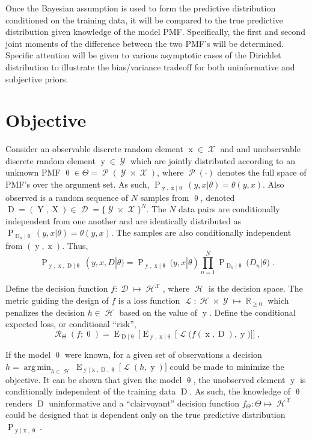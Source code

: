 \documentclass[conference]{IEEEtran}
\DeclareMathOperator*{\argmin}{arg\,min}
\DeclareMathOperator{\xrm}{\mathrm{x}}
\DeclareMathOperator{\Xrm}{\mathrm{X}}
\DeclareMathOperator{\yrm}{\mathrm{y}}
\DeclareMathOperator{\Yrm}{\mathrm{Y}}
\DeclareMathOperator{\Drm}{\mathrm{D}}
\DeclareMathOperator{\Prm}{\mathrm{P}}
\DeclareMathOperator{\Erm}{\mathrm{E}}
\DeclareMathOperator{\Xcal}{\mathcal{X}}
\DeclareMathOperator{\Ycal}{\mathcal{Y}}
\DeclareMathOperator{\Dcal}{\mathcal{D}}
\DeclareMathOperator{\Hcal}{\mathcal{H}}
\DeclareMathOperator{\Rcal}{\mathcal{R}}
\DeclareMathOperator{\Pcal}{\mathcal{P}}
\DeclareMathOperator{\Lcal}{\mathcal{L}}
\DeclareMathOperator{\Rbb}{\mathbb{R}}
\begin{document}
Once the Bayesian assumption is used to form the predictive distribution conditioned on the training data, it will be compared to the true predictive distribution given knowledge of the model PMF. Specifically, the first and second joint moments of the difference between the two PMF's will be determined. Specific attention will be given to various asymptotic cases of the Dirichlet distribution to illustrate the bias/variance tradeoff for both uninformative and subjective priors.







\section{Objective}

Consider an observable discrete random element $\xrm \in \Xcal$ and and unobservable discrete random element $\yrm \in \Ycal$ which are jointly distributed according to an unknown PMF $\uptheta \in \Theta = \Pcal(\Ycal \times \Xcal)$, where $\Pcal(\cdot)$ denotes the full space of PMF's over the argument set. As such, $\Prm_{\yrm,\xrm | \uptheta}(y,x | \theta) = \theta(y,x)$. Also observed is a random sequence of $N$ samples from $\uptheta$, denoted $\Drm = ( \Yrm,\Xrm ) \in \Dcal = \{\Ycal \times \Xcal\}^N$. The $N$ data pairs are conditionally independent from one another and are identically distributed as $\Prm_{\Drm_n | \uptheta}(y,x | \theta) = \theta(y,x)$. The samples are also conditionally independent from $(\yrm,\xrm)$. Thus,
\begin{equation}
\Prm_{\yrm,\xrm,\Drm | \uptheta}(y,x,D | \theta) = \Prm_{\yrm,\xrm | \uptheta}(y,x | \theta) \prod_{n=1}^N \Prm_{ \Drm_n | \uptheta }\big( D_n | \theta \big) \;.
\end{equation}

Define the decision function $f: \Dcal \mapsto \Hcal^{\Xcal}$, where $\Hcal$ is the decision space. The metric guiding the design of $f$ is a loss function $\Lcal: \Hcal \times \Ycal \mapsto \Rbb_{\geq 0}$ which penalizes the decision $h \in \Hcal$ based on the value of $\yrm$. Define the conditional expected loss, or conditional ``risk'',
\begin{equation} \label{eq:risk_cond}
\Rcal_{\Theta}(f ; \uptheta) = \Erm_{\Drm | \uptheta} \bigg[ \Erm_{\yrm,\xrm | \uptheta} \Big[ \Lcal\big( f(\xrm,\Drm),\yrm \big) \Big] \bigg] \;,
\end{equation}

If the model $\uptheta$ were known, for a given set of observations a decision $h = \argmin_{h \in \Hcal} \Erm_{\yrm | \xrm,\Drm,\uptheta}\big[ \Lcal(h,\yrm) \big]$ could be made to minimize the objective. It can be shown that given the model $\uptheta$, the unobserved element $\yrm$ is conditionally independent of the training data $\Drm$. As such, the knowledge of $\uptheta$ renders $\Drm$ uninformative and a ``clairvoyant'' decision function $f_{\Theta}: \Theta \mapsto \Hcal^{\Xcal}$ could be designed that is dependent only on the true predictive distribution $\Prm_{\yrm | \xrm,\uptheta}$.
\end{document}
